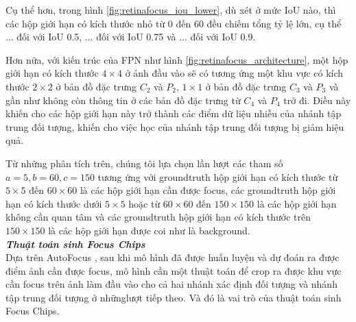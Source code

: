 {    \noindent
    Cụ thể hơn, trong hình \ref{fig:retinafocus_iou_lower}, dù xét ở mức IoU nào, thì các hộp giới hạn có kích thước nhỏ từ 0 đến 60 đều chiếm tổng tỷ lệ lớn, cụ thể ... đối với IoU 0.5, ... đối với IoU 0.75 và ... đối với IoU 0.9.

    \noindent
    Hơn nữa, với kiến trúc của FPN như hình \ref{fig:retinafocus_architecture}, một hộp giới hạn có kích thước $4 \times 4$ ở ảnh đầu vào sẽ có tương ứng một khu vực có kích thước $2 \times 2$ ở bản đồ đặc trưng ${C}_{2}$ và ${P}_{2}$, $1 \times 1$ ở bản đồ đặc trưng ${C}_{3}$ và ${P}_{3}$ và gần như không còn thông tin ở các bản đồ đặc trưng từ ${C}_{4}$ và ${P}_{4}$ trở đi.
    Điều này khiến cho các hộp giới hạn này trở thành các điểm dữ liệu nhiễu của nhánh tập trung đối tượng, khiến cho việc học của nhánh tập trung đối tượng bị giảm hiệu quả.

    \noindent
    Từ những phân tích trên, chúng tôi lựa chọn lần lượt các tham số $a = 5, b = 60, c = 150$ tương ứng với groundtruth hộp giới hạn có kích thước từ $5 \times 5$ đến $60 \times 60$ là các hộp giới hạn cần được focus, các groundtruth hộp giới hạn có kích thước dưới $5 \times 5$ hoặc từ $60 \times 60$ đến $150 \times 150$ là các hộp giới hạn không cần quan tâm và các groundtruth hộp giới hạn có kích thước trên $150 \times 150$ là các hộp giới hạn được coi như là background. \\

    \noindent
    \textbf{\textit{Thuật toán sinh Focus Chips}} \\
    Dựa trên AutoFocus \cite{najibi2019autofocus}, sau khi mô hình đã được huấn luyện và dự đoán ra được điểm ảnh cần được focus, mô hình cần một thuật toán để crop ra được khu vực cần focus trên ảnh làm đầu vào cho cả hai nhánh xác định đối tượng và nhánh tập trung đối tượng ở nhữnglượt tiếp theo.
    Và đó là vai trò của thuật toán sinh Focus Chips.

}
